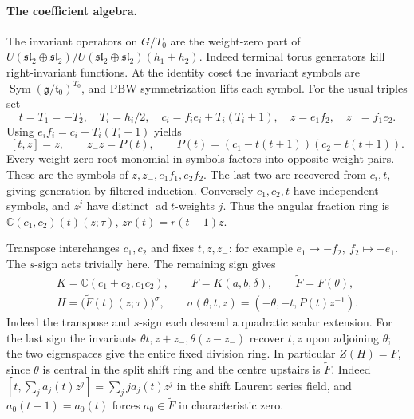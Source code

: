 \documentclass[11pt,a4paper]{article}
\theoremstyle{definition}
\begin{document}
\paragraph{The coefficient algebra.}
The invariant operators on \(G/T_0\) are the weight-zero part of
\(
 U(\mathfrak{sl}_2\oplus\mathfrak{sl}_2)/
 U(\mathfrak{sl}_2\oplus\mathfrak{sl}_2)(h_1+h_2)
\).
Indeed terminal torus generators kill right-invariant functions. At the identity coset the invariant symbols are
\(\operatorname{Sym}(\mathfrak g/\mathfrak t_0)^{T_0}\), and PBW symmetrization lifts each symbol. For the usual triples set
\[
 t=T_1=-T_2,\quad T_i=h_i/2,\quad c_i=f_ie_i+T_i(T_i+1),\quad
 z=e_1f_2,\quad z_-=f_1e_2 .
\]
Using \(e_if_i=c_i-T_i(T_i-1)\) yields
\begin{equation}\label{eq:c2quartic}
 [t,z]=z,\qquad z_-z=P(t),\qquad
 P(t)=(c_1-t(t+1))(c_2-t(t+1)).
\end{equation}
Every weight-zero root monomial in symbols factors into opposite-weight pairs. These are the symbols of \(z,z_-,e_1f_1,e_2f_2\). The last two are recovered from \(c_i,t\), giving generation by filtered induction. Conversely \(c_1,c_2,t\) have independent symbols, and \(z^j\) have distinct \(\operatorname{ad}t\)-weights \(j\). Thus the angular fraction ring is
\(\mathbb C(c_1,c_2)(t)(z;\tau)\), \(zr(t)=r(t-1)z\).

Transpose interchanges \(c_1,c_2\) and fixes \(t,z,z_-\): for example \(e_1\mapsto-f_2,\ f_2\mapsto-e_1\). The \(s\)-sign acts trivially here. The remaining sign gives
\begin{equation}\label{eq:c2horizontal}
 \begin{gathered}
 K=\mathbb C(c_1+c_2,c_1c_2),\qquad
 F=K(a,b,\delta),\qquad \widetilde F=F(\theta),\\
 H=\big(\widetilde F(t)(z;\tau)\big)^\sigma,\qquad
 \sigma(\theta,t,z)=(-\theta,-t,P(t)z^{-1}).
 \end{gathered}
\end{equation}
Indeed the transpose and \(s\)-sign each descend a quadratic scalar extension. For the last sign the invariants \(\theta t,z+z_-,\theta(z-z_-)\) recover \(t,z\) upon adjoining \(\theta\); the two eigenspaces give the entire fixed division ring. In particular \(Z(H)=F\), since \(\theta\) is central in the split shift ring and the centre upstairs is \(\widetilde F\). Indeed \([t,\sum_j a_j(t)z^j]=\sum_j j a_j(t)z^j\) in the shift Laurent series field, and \(a_0(t-1)=a_0(t)\) forces \(a_0\in\widetilde F\) in characteristic zero.
\end{document}
